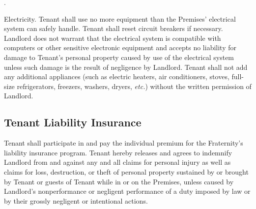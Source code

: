 \documentclass{article}
\begin{document}
\begin{compactList}{.}{}
  \item {\titleStyle Electricity.} Tenant shall use no more equipment than the
  Premises’ electrical system can safely handle. Tenant shall reset circuit
  breakers if necessary. Landlord does not warrant that the electrical system is
  compatible with computers or other sensitive electronic equipment and accepts
  no liability for damage to Tenant’s personal property caused by use of the
  electrical system unless such damage is the result of negligence by Landlord.
  Tenant shall not add any additional appliances (such as electric heaters, air
  conditioners, stoves, full-size refrigerators, freezers, washers, dryers,
  \textit{etc.}) without the written permission of Landlord.
\end{compactList}

\subsection{Tenant Liability Insurance}
Tenant shall participate in and pay the individual premium for the Fraternity’s
liability insurance program. Tenant hereby releases and agrees to indemnify
Landlord from and against any and all claims for personal injury as well as
claims for loss, destruction, or theft of personal property sustained by or
brought by Tenant or guests of Tenant while in or on the Premises, unless caused
by Landlord’s nonperformance or negligent performance of a duty imposed by law
or by their grossly negligent or intentional actions.

\hspace*{-\oddsidemargin}\hspace*{-1in}\hspace*{-\hoffset}%
\restoregeometry
\end{document}
